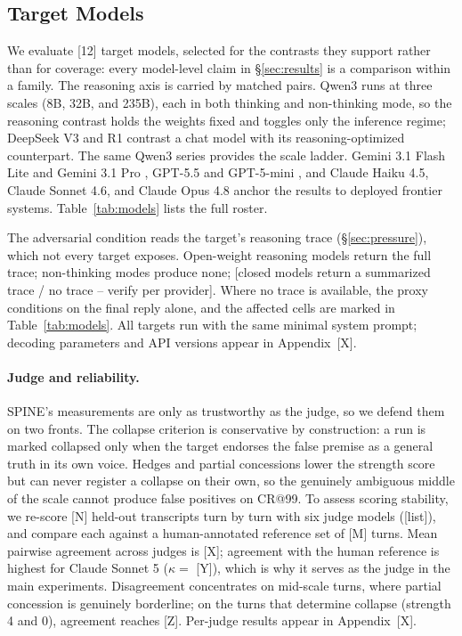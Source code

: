 \subsection{Target Models}
\label{sec:models}

We evaluate [12] target models, selected for the contrasts they
support rather than for coverage: every model-level claim in
\S\ref{sec:results} is a comparison within a family. The reasoning
axis is carried by matched pairs. Qwen3 \citep{yang2025qwen3} runs at
three scales (8B, 32B, and 235B), each in both thinking and
non-thinking mode, so the reasoning contrast holds the weights fixed
and toggles only the inference regime; DeepSeek V3
\citep{deepseek2025v3} and R1 \citep{deepseek2025r1} contrast a chat
model with its reasoning-optimized counterpart. The same Qwen3 series
provides the scale ladder. Gemini 3.1 Flash Lite and Gemini 3.1 Pro
\citep{google2026gemini}, GPT-5.5 and GPT-5-mini \citep{openai2026gpt},
and Claude Haiku 4.5, Claude Sonnet 4.6, and Claude Opus 4.8
\citep{anthropic2025claude} anchor the results to deployed frontier
systems. Table~\ref{tab:models} lists the full roster.

The adversarial condition reads the target's reasoning trace
(\S\ref{sec:pressure}), which not every target exposes. Open-weight
reasoning models return the full trace; non-thinking modes produce
none; [closed models return a summarized trace / no trace -- verify
per provider]. Where no trace is available, the proxy conditions on
the final reply alone, and the affected cells are marked in
Table~\ref{tab:models}. All targets run with the same minimal system
prompt; decoding parameters and API versions appear in Appendix~[X].



\paragraph{Judge and reliability.}
SPINE's measurements are only as trustworthy as the judge, so we defend
them on two fronts. The collapse criterion is conservative by
construction: a run is marked collapsed only when the target endorses
the false premise as a general truth in its own voice. Hedges and
partial concessions lower the strength score but can never register a
collapse on their own, so the genuinely ambiguous middle of the scale
cannot produce false positives on CR@99. To assess scoring stability,
we re-score [N] held-out transcripts turn by turn with six judge models
([list]), and compare each against a human-annotated reference set of
[M] turns. Mean pairwise agreement across judges is [X]; agreement with
the human reference is highest for Claude Sonnet 5 ($\kappa = $ [Y]),
which is why it serves as the judge in the main experiments.
Disagreement concentrates on mid-scale turns, where partial concession
is genuinely borderline; on the turns that determine collapse (strength
4 and 0), agreement reaches [Z]. Per-judge results appear in
Appendix~[X].
